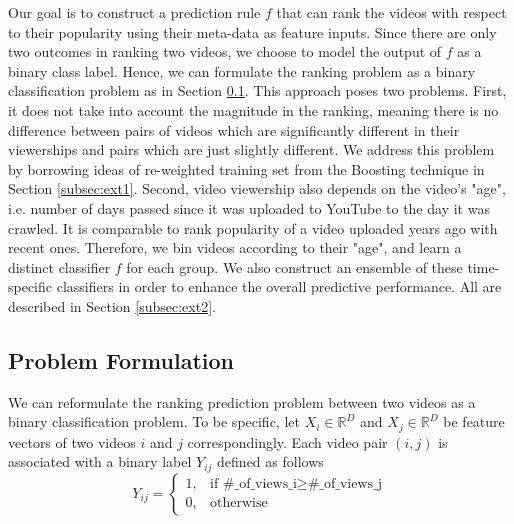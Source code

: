 Our goal is to construct a prediction rule $f$ that can rank the videos with respect to their popularity using their meta-data as feature inputs. Since there are only two outcomes in ranking two videos, we choose to model the output of $f$ as a binary class label. Hence, we can formulate the ranking problem as a binary classification problem as in Section \ref{subsec:probFormulation}. This approach poses two problems. First, it does not take into account the magnitude in the ranking, meaning there is no difference between pairs of videos which are significantly different in their viewerships and pairs which are just slightly different. We address this problem by borrowing ideas of re-weighted training set from the Boosting technique in Section \ref{subsec:ext1}. Second, video viewership also depends on the video's "age", i.e. number of days passed since it was uploaded to YouTube to the day it was crawled. It is comparable to rank popularity of a video uploaded years ago with recent ones. Therefore, we bin videos according to their "age", and learn a distinct classifier $f$ for each group. We also construct an ensemble of these time-specific classifiers in order to enhance the overall predictive performance. All are described in Section \ref{subsec:ext2}.

\subsection{Problem Formulation}
\label{subsec:probFormulation}
	We can reformulate the ranking prediction problem between two videos as a binary classification problem. To be specific, let $X_i \in \mathbb{R}^D$ and $X_j \in \mathbb{R}^D$ be feature vectors of two videos $i$ and $j$ correspondingly. Each video pair $(i, j)$ is associated with a binary label $Y_{ij}$ defined as follows
		\begin{equation}
		Y_{ij} = \begin{cases}
				   1, & \text{if } \text{\#\_of\_views\_i} \geq \text{\#\_of\_views\_j} \\
				   0, & \text{otherwise}
				\end{cases} 
		\label{eqn:binaryLabel}			
		\end{equation}	

